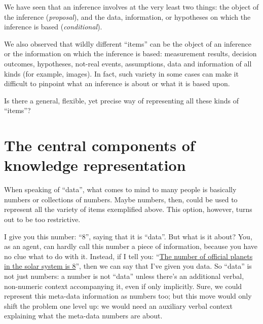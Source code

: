 \documentclass[
  a4paper,
  DIV=11,
  numbers=noendperiod,
  oneside]{scrreprt}
\begin{document}
\providecommand{\ul}{\uline}
\renewcommand*{\|}[1][]{\nonscript\:#1\vert\nonscript\:\mathopen{}}
\providecommand*{\pr}[1]{\textsf{\small`#1'}}
\renewcommand*{\pr}[1]{\textsf{\small`#1'}}
\providecommand*{\prq}[1]{\textsf{\small #1}}
\renewcommand*{\prq}[1]{\textsf{\small #1}}
\providecommand{\se}[1]{\mathsfit{#1}}
\renewcommand{\se}[1]{\mathsfit{#1}}
\providecommand{\p}{\mathrm{p}}
\renewcommand{\p}{\mathrm{p}}
\renewcommand{\P}{\mathrm{P}}

We have seen that an inference involves at the very least two things:
the object of the inference (\emph{proposal}), and the data,
information, or hypotheses on which the inference is based
(\emph{conditional}).

We also observed that wildly different ``items'' can be the object of an
inference or the information on which the inference is based:
measurement results, decision outcomes, hypotheses, not-real events,
assumptions, data and information of all kinds (for example, images). In
fact, such variety in some cases can make it difficult to pinpoint what
an inference is about or what it is based upon.

Is there a general, flexible, yet precise way of representing all these
kinds of ``items''?

\hypertarget{sec-central-comps}{%
\section{The central components of knowledge
representation}\label{sec-central-comps}}

When speaking of ``data'', what comes to mind to many people is
basically numbers or collections of numbers. Maybe numbers, then, could
be used to represent all the variety of items exemplified above. This
option, however, turns out to be too restrictive.

I give you this number: {``\(8\)'',} saying that it is ``data''. But
what is it about? You, as an agent, can hardly call this number a piece
of information, because you have no clue what to do with it. Instead, if
I tell you: ``\href{https://solarsystem.nasa.gov/planets/overview}{The
number of official planets in the solar system is 8}'', then we can say
that I've given you data. So ``data'' is not just numbers: a number is
not ``data'' unless there's an additional verbal, non-numeric context
accompanying it, even if only implicitly. Sure, we could represent this
meta-data information as numbers too; but this move would only shift the
problem one level up: we would need an auxiliary verbal context
explaining what the meta-data numbers are about.
\end{document}
